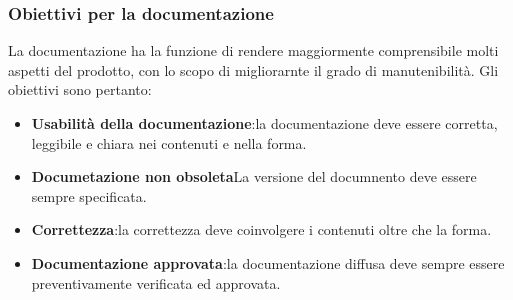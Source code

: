 \documentclass[12pt,a4paper]{article}
\begin{document}
\subsubsection{Obiettivi per la documentazione}
La documentazione ha la funzione di rendere maggiormente comprensibile molti aspetti del prodotto, con lo scopo di migliorarnte il grado di manutenibilità. 
Gli obiettivi sono pertanto:
\begin{itemize}
	\item\textbf{Usabilità della documentazione}:la documentazione deve essere corretta, leggibile e chiara nei contenuti e nella forma.
	\item\textbf{Documetazione non obsoleta}La versione del documnento deve essere sempre specificata.
	\item\textbf{Correttezza}:la correttezza deve coinvolgere i contenuti oltre che la forma.
	\item\textbf{Documentazione approvata}:la documentazione diffusa deve sempre essere preventivamente verificata ed approvata.
\end{itemize}
\end{document}
